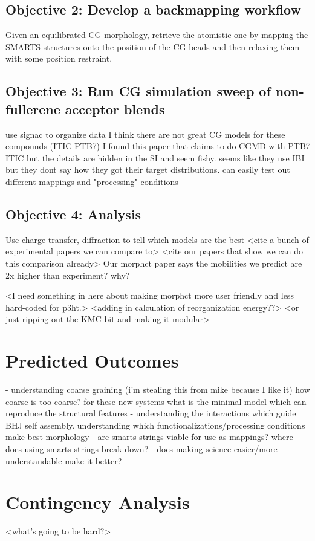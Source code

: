 \subsection*{Objective 2: Develop a backmapping workflow}
Given an equilibrated CG morphology, retrieve the atomistic one by mapping the SMARTS structures onto the position of the CG beads and then relaxing them with some position restraint. 

\subsection*{Objective 3: Run CG simulation sweep of non-fullerene acceptor blends}
use signac to organize data
I think there are not great CG models for these compounds (ITIC PTB7) I found this paper \cite{Meng2019} that claims to do CGMD with PTB7 ITIC but the details are hidden in the SI and seem fishy. seems like they use IBI but they dont say how they got their target distributions.
can easily test out different mappings and "processing" conditions

\subsection*{Objective 4: Analysis}
Use charge transfer, diffraction to tell which models are the best
<cite a bunch of experimental papers we can compare to>
<cite our papers that show we can do this comparison already>
Our morphct paper says the mobilities we predict are 2x higher than experiment? why?

<I need something in here about making morphct more user friendly and less hard-coded for p3ht.>
<adding in calculation of reorganization energy??> 
<or just ripping out the KMC bit and making it modular>

\section*{Predicted Outcomes}
- understanding coarse graining (i'm stealing this from mike because I like it) how coarse is too coarse? for these new systems what is the minimal model which can reproduce the structural features
- understanding the interactions which guide BHJ self assembly. understanding which functionalizations/processing conditions make best morphology
- are smarts strings viable for use as mappings? where does using smarts strings break down?
- does making science easier/more understandable make it better? 


\section*{Contingency Analysis}
<what's going to be hard?> 

